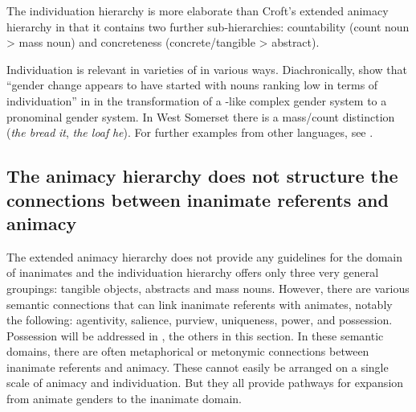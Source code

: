 \documentclass[output=collectionpaper]{langsci/langscibook}
\begin{document}
The individuation hierarchy is more elaborate than Croft's extended animacy hierarchy in that it contains two further sub-hierarchies: countability (count noun > mass noun) and concreteness (concrete/tangible > abstract).

Individuation is relevant in varieties of  in various ways. Diachronically, \cite[527]{Siemund2011} show that ``gender change appears to have started with nouns ranking low in terms of individuation'' in  in the transformation of a -like complex gender system to a pronominal gender system. In West Somerset  there is a mass/count distinction (\textit{the bread} \textendash{} \textit{it}, \textit{the loaf} \textendash{} \textit{he}). For further examples from other languages, see \cite[175--217]{Siemund2008}.

  \subsection{The animacy hierarchy does not structure the connections between inanimate referents and animacy}
\label{sec:WDG:3.3}

The extended animacy hierarchy does not provide any guidelines for the domain of inanimates and the individuation hierarchy offers only three very general groupings: tangible objects, abstracts and mass nouns. However, there are various semantic connections that can link inanimate referents with animates, notably the following: agentivity, salience, purview, uniqueness, power, and possession. Possession will be addressed in , the others in this section. In these semantic domains, there are often metaphorical or metonymic connections between inanimate referents and animacy. These cannot easily be arranged on a single scale of animacy and individuation. But they all provide pathways for expansion from animate genders to the inanimate domain.
\end{document}
